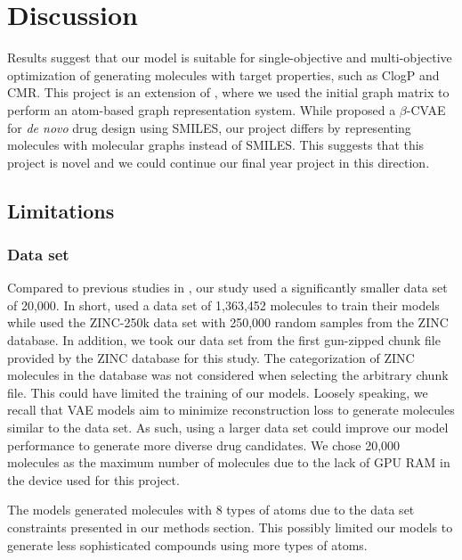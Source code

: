\chapter{Discussion}
Results suggest that our model is suitable for single-objective and multi-objective optimization of generating molecules with target properties, such as ClogP and CMR. This project is an extension of \cite{lee2022mgcvae}, where we used the initial graph matrix to perform an atom-based graph representation system. While \cite{richards2022conditional} proposed a $\beta$-CVAE for \textit{de novo} drug design using SMILES, our project differs by representing molecules with molecular graphs instead of SMILES. This suggests that this project is novel and we could continue our final year project in this direction.

\section{Limitations}
\subsection{Data set} Compared to previous studies in \cite{lee2022mgcvae, richards2022conditional}, our study used a significantly smaller data set of 20,000. In short, \cite{lee2022mgcvae} used a data set of 1,363,452 molecules to train their models while \cite{richards2022conditional} used the ZINC-250k data set with 250,000 random samples from the ZINC database. In addition, we took our data set from the first gun-zipped chunk file provided by the ZINC database for this study. The categorization of ZINC molecules in the database was not considered when selecting the arbitrary chunk file. This could have limited the training of our models. Loosely speaking, we recall that VAE models aim to minimize reconstruction loss to generate molecules similar to the data set. As such, using a larger data set could improve our model performance to generate more diverse drug candidates. We chose 20,000 molecules as the maximum number of molecules due to the lack of GPU RAM in the device used for this project. 

The models generated molecules with 8 types of atoms due to the data set constraints presented in our methods section. This possibly limited our models to generate less sophisticated compounds using more types of atoms. 

